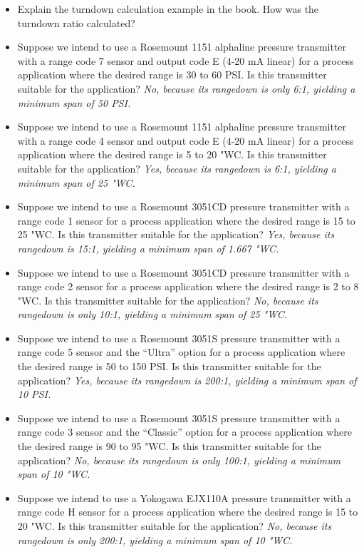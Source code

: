 \begin{itemize}
\begin{itemize}
\begin{itemize}
\begin{itemize}
\item{} Explain the turndown calculation example in the book.  How was the turndown ratio calculated?
\vskip 5pt
\item{} Suppose we intend to use a Rosemount 1151 alphaline pressure transmitter with a range code 7 sensor and output code E (4-20 mA linear) for a process application where the desired range is 30 to 60 PSI.  Is this transmitter suitable for the application?  {\it No, because its rangedown is only 6:1, yielding a minimum span of 50 PSI.}
\vskip 5pt
\item{} Suppose we intend to use a Rosemount 1151 alphaline pressure transmitter with a range code 4 sensor and output code E (4-20 mA linear) for a process application where the desired range is 5 to 20 "WC.  Is this transmitter suitable for the application?  {\it Yes, because its rangedown is 6:1, yielding a minimum span of 25 "WC.}
\vskip 5pt
\item{} Suppose we intend to use a Rosemount 3051CD pressure transmitter with a range code 1 sensor for a process application where the desired range is 15 to 25 "WC.  Is this transmitter suitable for the application?  {\it Yes, because its rangedown is 15:1, yielding a minimum span of 1.667 "WC.}
\vskip 5pt
\item{} Suppose we intend to use a Rosemount 3051CD pressure transmitter with a range code 2 sensor for a process application where the desired range is 2 to 8 "WC.  Is this transmitter suitable for the application?  {\it No, because its rangedown is only 10:1, yielding a minimum span of 25 "WC.}
\vskip 5pt
\item{} Suppose we intend to use a Rosemount 3051S pressure transmitter with a range code 5 sensor and the ``Ultra'' option for a process application where the desired range is 50 to 150 PSI.  Is this transmitter suitable for the application?  {\it Yes, because its rangedown is 200:1, yielding a minimum span of 10 PSI.}
\vskip 5pt
\item{} Suppose we intend to use a Rosemount 3051S pressure transmitter with a range code 3 sensor and the ``Classic'' option for a process application where the desired range is 90 to 95 "WC.  Is this transmitter suitable for the application?  {\it No, because its rangedown is only 100:1, yielding a minimum span of 10 "WC.}
\vskip 5pt
\item{} Suppose we intend to use a Yokogawa EJX110A pressure transmitter with a range code H sensor for a process application where the desired range is 15 to 20 "WC.  Is this transmitter suitable for the application?  {\it No, because its rangedown is only 200:1, yielding a minimum span of 10 "WC.}

\end{itemize}
\end{itemize}
\end{itemize}
\end{itemize}
